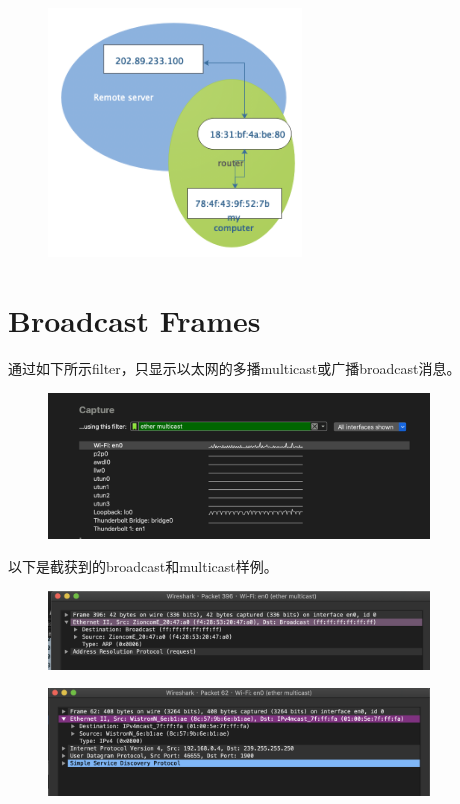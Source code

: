 \documentclass{article}
\begin{document}
    \begin{figure}[H]
        \centering
        \includegraphics[width=0.6\textwidth]{img/exp123C.png} 
        \caption{}
        \label{fig.5}
    \end{figure}
    
    \section{Broadcast Frames}
    通过如下所示filter，只显示以太网的多播multicast或广播broadcast消息。
    

 \begin{figure}[H]
        \centering
        \includegraphics[width=0.9\textwidth]{img/exp1cast.png}
        \caption{}
        \label{fig.6}
    \end{figure}
    以下是截获到的broadcast和multicast样例。
     \begin{figure}[H]
        \centering
        \includegraphics[width=0.9\textwidth]{img/exp1broad.png}
        \caption{}
        \label{fig.7}
    \end{figure}
    \begin{figure}[H]
        \centering
        \includegraphics[width=0.9\textwidth]{img/exp1multi.png}
        \caption{}
        \label{fig.8}
    \end{figure}
  
\end{document}
